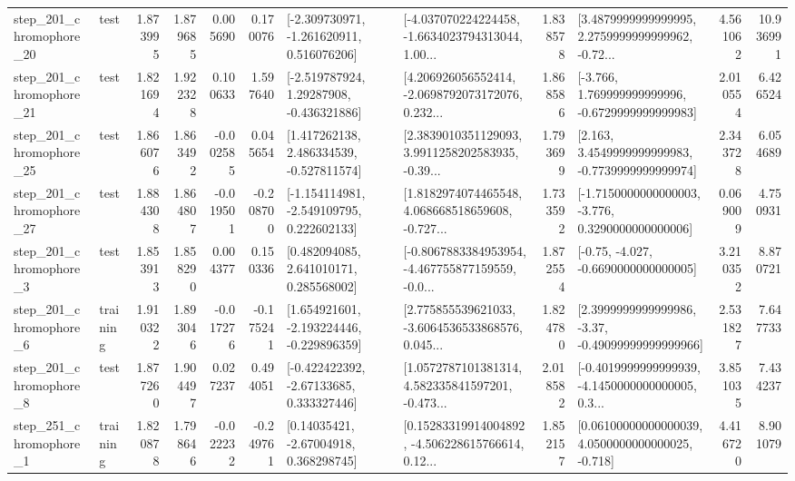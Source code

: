 \begin{tabular}{llrrrrllrlrr}
  step\_201\_chromophore\_20 &      test &      1.873995 &    1.879685 &      0.005690 &  0.170076 &   [-2.309730971, -1.261620911, 0.516076206] &  [-4.037070224224458, -1.6634023794313044, 1.00... &       1.838578 &  [3.4879999999999995, 2.2759999999999962, -0.72... &            4.561062 &         10.936991 \\
  step\_201\_chromophore\_21 &      test &      1.821694 &    1.922328 &      0.100633 &  1.597640 &    [-2.519787924, 1.29287908, -0.436321886] &  [4.206926056552414, -2.0698792073172076, 0.232... &       1.868586 &   [-3.766, 1.769999999999996, -0.6729999999999983] &            2.010554 &          6.426524 \\
  step\_201\_chromophore\_25 &      test &      1.866076 &    1.863492 &     -0.002585 &  0.045654 &    [1.417262138, 2.486334539, -0.527811574] &  [2.3839010351129093, 3.9911258202583935, -0.39... &       1.793699 &   [2.163, 3.4549999999999983, -0.7739999999999974] &            2.343728 &          6.054689 \\
  step\_201\_chromophore\_27 &      test &      1.884308 &    1.864807 &     -0.019501 & -0.208700 &   [-1.154114981, -2.549109795, 0.222602133] &  [1.8182974074465548, 4.068668518659608, -0.727... &       1.733592 &  [-1.7150000000000003, -3.776, 0.3290000000000006] &            0.069009 &          4.750931 \\
   step\_201\_chromophore\_3 &      test &      1.853913 &    1.858290 &      0.004377 &  0.150336 &     [0.482094085, 2.641010171, 0.285568002] &  [-0.8067883384953954, -4.467755877159559, -0.0... &       1.872554 &               [-0.75, -4.027, -0.6690000000000005] &            3.210352 &          8.870721 \\
   step\_201\_chromophore\_6 &  training &      1.910322 &    1.893046 &     -0.017276 & -0.175241 &   [1.654921601, -2.193224446, -0.229896359] &  [2.775855539621033, -3.6064536533868576, 0.045... &       1.824780 &  [2.3999999999999986, -3.37, -0.49099999999999966] &            2.531827 &          7.647733 \\
   step\_201\_chromophore\_8 &      test &      1.877260 &    1.904497 &      0.027237 &  0.494051 &    [-0.422422392, -2.67133685, 0.333327446] &  [1.0572787101381314, 4.582335841597201, -0.473... &       2.018582 &  [-0.4019999999999939, -4.1450000000000005, 0.3... &            3.851035 &          7.434237 \\
   step\_251\_chromophore\_1 &  training &      1.820878 &    1.798646 &     -0.022232 & -0.249761 &      [0.14035421, -2.67004918, 0.368298745] &  [0.15283319914004892, -4.506228615766614, 0.12... &       1.852157 &  [0.06100000000000039, 4.0500000000000025, -0.718] &            4.416720 &          8.901079 \\

\end{tabular}
